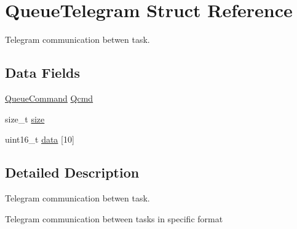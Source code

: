 \hypertarget{struct_queue_telegram}{\section{Queue\+Telegram Struct Reference}
\label{struct_queue_telegram}
}


Telegram communication betwen task.  


\subsection*{Data Fields}
\begin{DoxyCompactItemize}
\item 
\hyperlink{main_8h_a87d564e7bd6c8ad9e1088c17ba0f91f4}{Queue\+Command} \hyperlink{struct_queue_telegram_a752eb6858a0e18355371dc6cdc559e64}{Qcmd}
\item 
size\+\_\+t \hyperlink{struct_queue_telegram_a5adaf2ba7c2db4f8f198143783d09db3}{size}
\item 
uint16\+\_\+t \hyperlink{struct_queue_telegram_a43b68c4a7f4cee5a8ff61cfe38efc716}{data} \mbox{[}10\mbox{]}
\end{DoxyCompactItemize}


\subsection{Detailed Description}
Telegram communication betwen task. 

Telegram communication between tasks in specific format 

